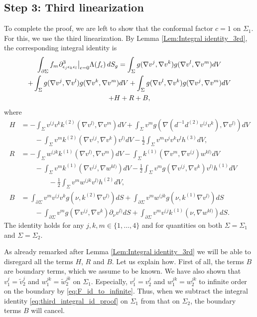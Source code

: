 \documentclass[12pt]{amsart}
\def\p{\partial}
\theoremstyle{definition}
\theoremstyle{remark}
\newcommand{\eps}{\epsilon}
\newcommand{\s}{\hspace{0.5pt}}
\begin{document}
\subsection{Step 3: Third linearization}
To complete the proof, we are left to show that the conformal factor $c=1$ on $\Sigma_1$. For this, we use the third linearization. By Lemma \ref{Lem:Integral identity_3rd}, the corresponding integral identity is 
	\begin{multline}\label{eq:third_integral_id_proof}
	 \int_{\p \Sigma} f_m \s \p^3_{\eps_j \eps_k\eps_l}\big|_{\epsilon=0} \Lambda (f_\epsilon) \, dS_g = \int_{\Sigma}g(\nabla v^{j},\nabla v^k)g(\nabla v^{l},\nabla v^m) dV  \\
	 +\int_{\Sigma}g(\nabla v^{j},\nabla v^l)g(\nabla v^{k},\nabla v^m) dV+\int_{\Sigma}g(\nabla v^{l},\nabla v^k)g(\nabla v^{j},\nabla v^m) dV \\
	 +H+R+B,
	\end{multline}
	where
	\begin{equation*}%
 \begin{split}
 H&=-\int_{\Sigma}v^{(j}v^{k} k^{(2)}(\nabla v^{l)},\nabla v^m) dV +\int_{\Sigma}v^m g(\nabla (d^{-1}d^{(2)}v^{(j}v^k),\nabla v^{l)})dV \\
 &\qquad-\int_\Sigma v^m k^{(2)}(\nabla v^{(j},\nabla v^{k})v^{l)}dV-\frac{1}{2}\int_\Sigma v^mv^{j}v^{k}v^{l}h^{(3)}dV,\\
 R&=-\int_{\Sigma}w^{(jk}k^{(1)}(\nabla v^{l)},\nabla v^m)dV-\int_\Sigma k^{(1)}(\nabla v^m,\nabla v^{(j})w^{kl)}dV \\
 &\qquad-\int_{\Sigma}v^mk^{(1)}(\nabla v^{(j},\nabla w^{kl)})dV-\frac{1}{2}\int_\Sigma v^mg(\nabla v^{(j},\nabla v^{k})v^{l)}h^{(1)}dV  \\
 &\qquad \qquad -\frac{1}{2}\int_\Sigma v^mw^{(jk}v^{l)}h^{(2)}dV,   \\
 B&=\int_{\p \Sigma} v^mv^{(j}v^k g(\nu,k^{(2)}\nabla v^{l)})dS+\int_{\p \Sigma} v^mw^{(jk} g(\nu,k^{(1)}\nabla v^{l)})dS\\
&\qquad-\int_{\p \Sigma} v^mg(\nabla v^{(j},\nabla v^k)\p_\nu v^{l)}dS+\int_{\p \Sigma} v^mv^{(j} k^{(1)}(\nu,\nabla w^{kl)})dS.
\end{split}
\end{equation*}
The identity holds for any $j,k,m\in \{1,\ldots,4\}$ and for quantities on both $\Sigma=\Sigma_1$ and $\Sigma=\Sigma_2$. 

As already remarked after Lemma \ref{Lem:Integral identity_3rd} we will be able to disregard all the terms $H$, $R$ and $B$. Let us explain how. First of all, the terms $B$ are boundary terms, which we assume to be known. We have also shown that $v_1^{j}=\tilde v_2^{j}$ and $w_1^{jk}=\tilde w_2^{jk}$ on $\Sigma_1$. Especially, $v_1^{j}= v_2^{j}$ and $w_1^{jk}=w_2^{jk}$ to infinite order on the boundary by \eqref{eq:F_id_to_infinite}. Thus, when we subtract the integral identity \eqref{eq:third_integral_id_proof} on $\Sigma_1$ from that on $\Sigma_2$, the boundary terms $B$ will cancel. 
\end{document}
